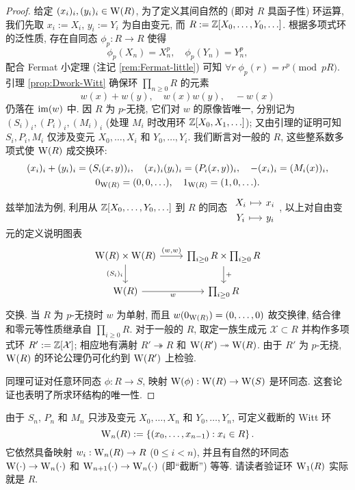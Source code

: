 \begin{proof}
	给定 $(x_i)_i, (y_i)_i \in \operatorname{W}(R)$, 为了定义其间自然的 (即对 $R$ 具函子性) 环运算, 我们先取 $x_i := X_i$, $y_i := Y_i$ 为自由变元, 而 $R := \mathbb{Z}[X_0, \ldots, Y_0, \ldots]$. 根据多项式环的泛性质, 存在自同态 $\phi_p: R \to R$ 使得
	\[ \phi_p(X_n) = X_n^p, \quad \phi_p(Y_n) = Y_n^p, \]
	配合 Fermat 小定理 (注记 \ref{rem:Fermat-little}) 可知 $\forall r \; \phi_p(r) = r^p \pmod{pR}$. 引理 \ref{prop:Dwork-Witt} 确保环 $\prod_{n \geq 0} R$ 的元素
	\[ w(x) + w(y), \quad w(x)w(y), \quad -w(x) \]
	仍落在 $\operatorname{im}(w)$ 中. 因 $R$ 为 $p$-无挠, 它们对 $w$ 的原像皆唯一, 分别记为 $(S_i)_i, (P_i)_i, (M_i)_i$ (处理 $M_i$ 时改用环 $\mathbb{Z}[X_0, X_1, \ldots]$); 又由引理的证明可知 $S_i, P_i, M_i$ 仅涉及变元 $X_0, \ldots, X_i$ 和 $Y_0, \ldots, Y_i$. 我们断言对一般的 $R$, 这些整系数多项式使 $\operatorname{W}(R)$ 成交换环:
	\begin{gather*}
		(x_i)_i + (y_i)_i = (S_i(x,y))_i, \quad (x_i)_i (y_i)_i = (P_i(x,y))_i, \quad  -(x_i)_i = (M_i(x))_i, \\
		0_{\operatorname{W}(R)} = (0,0, \ldots), \quad 1_{\operatorname{W}(R)} = (1,0,\ldots).
	\end{gather*}
	兹举加法为例, 利用从 $\mathbb{Z}[X_0, \ldots, Y_0, \ldots]$ 到 $R$ 的同态
	$\begin{tikzcd}[row sep=0pt, column sep=small] X_i \arrow[mapsto, r] & x_i \\ Y_i \arrow[mapsto, r] & y_i \end{tikzcd}$,
	以上对自由变元的定义说明图表
	\[\begin{tikzcd}
		\WittV(R) \times \WittV(R) \arrow[d, "{(S_i)_i}"'] \arrow[r, "{(w,w)}"] & \prod_{i \geq 0} R  \times \prod_{i \geq 0} R \arrow[d, "+"] \\
		\WittV(R) \arrow[r, "w"'] & \prod_{i \geq 0} R
	\end{tikzcd}\]
	交换. 当 $R$ 为 $p$-无挠时 $w$ 为单射, 而且 $w(0_{\operatorname{W}(R)}) = (0, \ldots, 0)$ 故交换律, 结合律和零元等性质继承自 $\prod_{i \geq 0} R$. 对于一般的 $R$, 取定一族生成元 $\mathcal{X} \subset R$ 并构作多项式环 $R' := \mathbb{Z}[\mathcal{X}]$; 相应地有满射 $R' \twoheadrightarrow R$ 和 $\operatorname{W}(R') \twoheadrightarrow \operatorname{W}(R)$. 由于 $R'$ 为 $p$-无挠, $\operatorname{W}(R)$ 的环论公理仍可化约到 $\operatorname{W}(R')$ 上检验.
	
	同理可证对任意环同态 $\phi: R \to S$, 映射 $\operatorname{W}(\phi): \operatorname{W}(R) \to \operatorname{W}(S)$ 是环同态. 这套论证也表明了所求环结构的唯一性.
\end{proof}

由于 $S_n$, $P_n$ 和 $M_n$ 只涉及变元 $X_0, \ldots, X_n$ 和 $Y_0, \ldots, Y_n$, 可定义截断的 Witt 环 
\[ \operatorname{W}_n(R)  := \left\{ (x_0, \ldots, x_{n-1}) : x_i \in R \right\}. \]
它依然具备映射 $w_i: \operatorname{W}_n(R) \to R$ ($0 \leq i < n$), 并且有自然的环同态 $\operatorname{W}(\cdot) \to \operatorname{W}_n(\cdot)$ 和 $\operatorname{W}_{n+1}(\cdot) \to \operatorname{W}_n(\cdot)$ (即``截断'') 等等. 请读者验证环 $\operatorname{W}_1(R)$ 实际就是 $R$.

